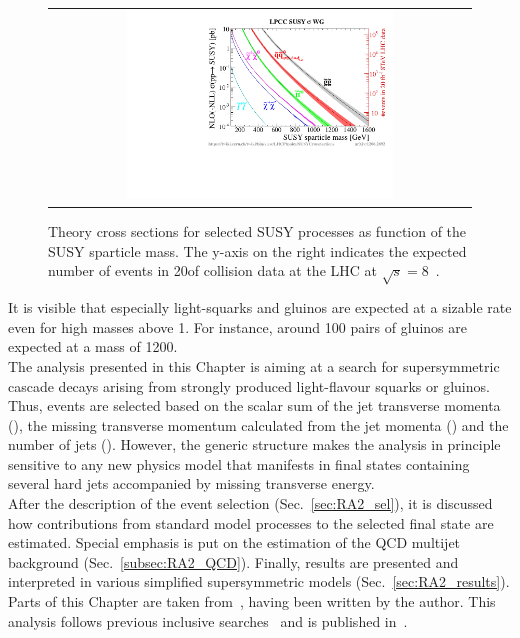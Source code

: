 \begin{figure}[!h]
  \centering
  \begin{tabular}{c}
                \includegraphics[width=0.65\textwidth]{figures/xsections_strong.pdf} 
  \end{tabular}
  \caption{Theory cross sections for selected SUSY processes as function of the SUSY sparticle mass. The y-axis on the right indicates the expected number of events in 20\fbinv of \pp collision data at the LHC at $\sqrt{s}=8$\tev~\cite{Kramer:2012bx}.}
  \label{fig:susy_theory_xs}
\end{figure}
It is visible that especially light-squarks and gluinos are expected at a sizable rate even for high masses above 1\tev. For instance, around 100 pairs of gluinos are expected at a mass of 1200\gev. \\
The analysis presented in this Chapter is aiming at a search for supersymmetric cascade decays arising from strongly produced light-flavour squarks or gluinos. Thus, events are selected based on the scalar sum of the jet transverse momenta (\HT), the missing transverse momentum calculated from the jet momenta (\MHT) and the number of jets (\NJets). However, the generic structure makes the analysis in principle sensitive to any new physics model that manifests in final states containing several hard jets accompanied by missing transverse energy. \\
After the description of the event selection (Sec.~\ref{sec:RA2_sel}), it is discussed how contributions from standard model processes to the selected final state are estimated. Special emphasis is put on the estimation of the QCD multijet background (Sec.~\ref{subsec:RA2_QCD}). Finally, results are presented and interpreted in various simplified supersymmetric models (Sec.~\ref{sec:RA2_results}). Parts of this Chapter are taken from~\cite{bib:AN-12-350}, having been written by the author. This analysis follows previous inclusive searches~\cite{springerlink:10.1007/JHEP08(2011)155, Chatrchyan:2012lia} and is published in~\cite{Chatrchyan:2014lfa}.    
